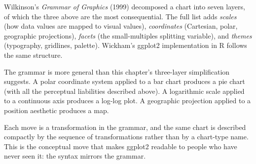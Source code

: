 \documentclass[
  letterpaper,
  11pt,
  twoside,
  openany]{scrbook}
\begin{document}
\begin{tcolorbox}[enhanced jigsaw, arc=.35mm, bottomrule=.15mm, bottomtitle=1mm, breakable, colback=white, colbacktitle=quarto-callout-note-color!10!white, colframe=quarto-callout-note-color-frame, coltitle=black, left=2mm, leftrule=.75mm, opacityback=0, opacitybacktitle=0.6, rightrule=.15mm, title=\textcolor{quarto-callout-note-color}{\faInfo}\hspace{0.5em}{Inside the math: a more formal grammar}, titlerule=0mm, toprule=.15mm, toptitle=1mm]

Wilkinson's \emph{Grammar of Graphics} (1999) decomposed a chart into
seven layers, of which the three above are the most consequential. The
full list adds \emph{scales} (how data values are mapped to visual
values), \emph{coordinates} (Cartesian, polar, geographic projections),
\emph{facets} (the small-multiples splitting variable), and
\emph{themes} (typography, gridlines, palette). Wickham's ggplot2
implementation in R follows the same structure.

The grammar is more general than this chapter's three-layer
simplification suggests. A polar coordinate system applied to a bar
chart produces a pie chart (with all the perceptual liabilities
described above). A logarithmic scale applied to a continuous axis
produces a log-log plot. A geographic projection applied to a position
aesthetic produces a map.

Each move is a transformation in the grammar, and the same chart is
described compactly by the sequence of transformations rather than by a
chart-type name. This is the conceptual move that makes ggplot2 readable
to people who have never seen it: the syntax mirrors the grammar.

\end{tcolorbox}
\end{document}
